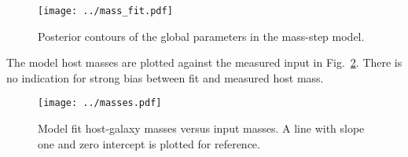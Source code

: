 \documentclass{aastex61}   	%
\begin{document}
\begin{figure}[htbp] %
   \centering
   \texttt{[image: ../mass\_fit.pdf]}
   \caption{Posterior contours of the global parameters in the mass-step model.
   \label{mass_fit:fig}}
\end{figure}

The  model host masses are plotted  against the measured input in  Fig.~\ref{masses:fig}.
There is no indication for strong bias between fit and measured host mass.


\begin{figure}[htbp] %
   \centering
   \texttt{[image: ../masses.pdf]}
   \caption{Model fit host-galaxy masses versus input masses.  A line with slope one and zero intercept is plotted for reference.
   \label{masses:fig}}
\end{figure}




\end{document}
